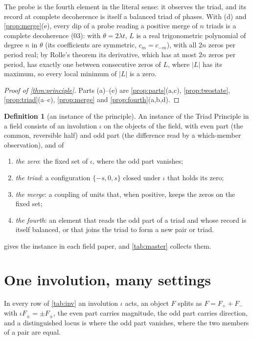 \documentclass[11pt]{article}
\theoremstyle{definition}\newtheorem{definition}[theorem]{Definition}
\theoremstyle{remark}\newtheorem{remark}[theorem]{Remark}
\begin{document}
The probe is the fourth element in the literal sense: it observes the triad, and its record at complete decoherence is itself a balanced triad of phases. With (d) and \cref{prop:merge}(e), every dip of a probe reading a positive merge of $n$ triads is a complete decoherence (03): with $\theta=2\lambda t$, $L$ is a real trigonometric polynomial of degree $n$ in $\theta$ (its coefficients are symmetric, $c_m=c_{-m}$), with all $2n$ zeros per period real; by Rolle's theorem its derivative, which has at most $2n$ zeros per period, has exactly one between consecutive zeros of $L$, where $|L|$ has its maximum, so every local minimum of $|L|$ is a zero.

\begin{proof}[Proof of \cref{thm:principle}]
Parts (a)--(e) are \cref{prop:parts}(a,c), \cref{prop:twostate}, \cref{prop:triad}(a--c), \cref{prop:merge} and \cref{prop:fourth}(a,b,d).
\end{proof}

\begin{definition}[an instance of the principle]\label{def:instance}
An instance of the Triad Principle in a field consists of an involution $\iota$ on the objects of the field, with even part (the common, reversible half) and odd part (the difference read by a which-member observation), and of
\begin{enumerate}[label=(\roman*)]
\item \emph{the zero}: the fixed set of $\iota$, where the odd part vanishes;
\item \emph{the triad}: a configuration $\{-s,0,s\}$ closed under $\iota$ that holds its zero;
\item \emph{the merge}: a coupling of units that, when positive, keeps the zeros on the fixed set;
\item \emph{the fourth}: an element that reads the odd part of a triad and whose record is itself balanced, or that joins the triad to form a new pair or triad.
\end{enumerate}
\end{definition}
 gives the instance in each field paper, and \cref{tab:master} collects them.

\section{One involution, many settings}\label{sec:table}
In every row of \cref{tab:inv} an involution $\iota$ acts, an object $F$ splits as $F=F_++F_-$ with $\iota F_\pm=\pm F_\pm$, the even part carries magnitude, the odd part carries direction, and a distinguished locus is where the odd part vanishes, where the two members of a pair are equal.
\end{document}
